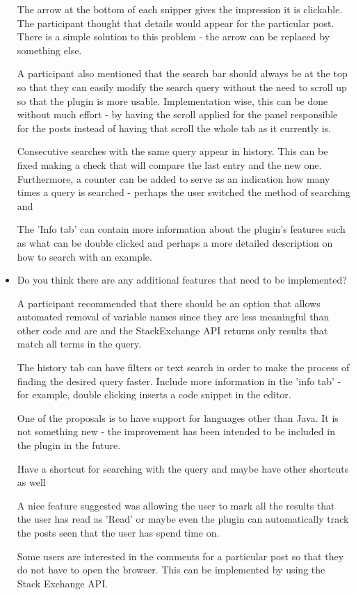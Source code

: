 \documentclass{l4proj}
\begin{document}
\begin{itemize}
The arrow at the bottom of each snipper gives the impression it is clickable. The participant thought that details would appear for the particular post. There is a simple solution to this problem - the arrow can be replaced by something else.

A participant also mentioned that the search bar should always be at the top so that they can easily modify the search query without the need to scroll up so that the plugin is more usable. Implementation wise, this can be done without much effort - by having the scroll applied for the panel responsible for the posts instead of having that scroll the whole tab as it currently is.

Consecutive searches with the same query appear in history. This can be fixed making a check that will compare the last entry and the new one. Furthermore, a counter can be added to serve as an indication how many times a query is searched - perhaps the user switched the method of searching and

The 'Info tab' can contain more information about the plugin's features such as what can be double clicked and perhaps a more detailed description on how to search with an example.

\item Do you think there are any additional features that need to be implemented?

A participant recommended that there should be an option that allows automated removal of variable names since they are less meaningful than other code and are and the StackExchange API returns only results that match all terms in the query.

The history tab can have filters or text search in order to make the process of finding the desired query faster.
Include more information in the 'info tab' - for example, double clicking inserts a code snippet in the editor.

One of the proposals is to have support for languages other than Java. It is not something new - the improvement has been intended to be included in the plugin in the future.

Have a shortcut for searching with the query and maybe have other shortcuts as well

A nice feature suggested was allowing the user to mark all the results that the user has read as 'Read' or maybe even the plugin can automatically track the posts seen that the user has spend time on.

Some users are interested in the comments for a particular post so that they do not have to open the browser. This can be implemented by using the Stack Exchange API.


\end{itemize}
\end{document}
